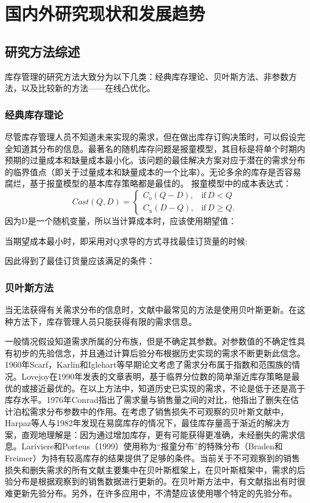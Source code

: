 \documentclass[lang=cn,11pt,a4paper]{elegantpaper}
\begin{document}
\section{国内外研究现状和发展趋势}
\subsection{研究方法综述}

库存管理的研究方法大致分为以下几类：经典库存理论、贝叶斯方法、非参数方法，以及比较新的方法——在线凸优化。
\subsubsection{经典库存理论}
尽管库存管理人员不知道未来实现的需求，但在做出库存订购决策时，可以假设完全知道其分布的信息。最著名的随机库存问题是报童模型，其目标是将单个时期内预期的过量成本和缺量成本最小化。该问题的最佳解决方案对应于潜在的需求分布的临界值点（即关于过量成本和缺量成本的一个比率）。无论多余的库存是否容易腐烂，基于报童模型的基本库存策略都是最佳的。
报童模型中的成本表达式：
\begin{equation}
    Cost\left( Q,D\right) =
    {\begin{cases}
        C_{o}\left( Q-D\right) , & \text{if}\,D<Q \\
        C_{u}\left( D-Q\right) , & \text{if}\,D\geq Q.
    \end{cases}}
\end{equation}
因为D是一个随机变量，所以当计算成本时，应该使用期望值：

当期望成本最小时，即采用对Q求导的方式寻找最佳订货量的时候:
 
因此得到了最佳订货量应该满足的条件：

\subsubsection{贝叶斯方法}

当无法获得有关需求分布的信息时，文献中最常见的方法是使用贝叶斯更新。在这种方法下，库存管理人员只能获得有限的需求信息。

一般情况假设知道需求所属的分布族，但是不确定其参数。对参数值的不确定性具有初步的先验信念，并且通过计算后验分布根据历史实现的需求不断更新此信念。1960年Scarf，Karlin和Iglehart等早期论文考虑了需求分布属于指数和范围族的情况。Lovejoy在1990年发表的文章表明，基于临界分位数的简单渐近库存策略是最优的或接近最优的。在以上方法中，知道历史已实现的需求，不论是低于还是高于库存水平。1976年Conrad指出了需求量与销售量之间的对比，他指出了删失在估计泊松需求分布参数中的作用。在考虑了销售损失不可观察的贝叶斯文献中，Harpaz等人与1982年发现在易腐库存的情况下，最佳库存量高于渐近的解决方案，直观地理解是：因为通过增加库存，更有可能获得更准确，未经删失的需求信息。Lariviere和Porteus（1999）使用称为“报童分布”的特殊分布（Braden和Freimer）为持有较高库存的结果提供了足够的条件。当前关于不可观察到的销售损失和删失需求的所有文献主要集中在贝叶斯框架上，在贝叶斯框架中，需求的后验分布是根据观察到的销售数据进行更新的。在贝叶斯方法中，有文献指出有时很难更新先验分布。另外，在许多应用中，不清楚应该使用哪个特定的先验分布。
\end{document}
